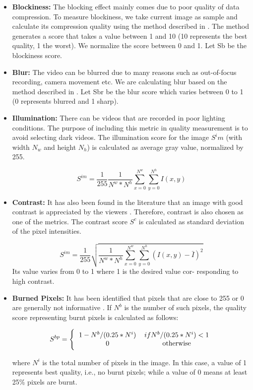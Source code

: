 \documentclass{sig-alternate}
\begin{document}
\begin{itemize}
\item \textbf{Blockiness:} The blocking effect mainly comes due to poor quality of data compression. To measure blockiness, we take current image as sample and calculate its compression quality using the method described in \cite{18}. The method generates
a score that takes a value between 1 and 10 (10 represents the
best quality, 1 the worst). We normalize the score between 0
and 1. Let Sb be the blockiness score.
\item \textbf{Blur:} The video can be blurred due to many reasons such as out-of-focus recording, camera movement etc. We are calculating blur based on the method described in \cite{5}. Let Sbr be the blur score which varies between 0 to 1 (0 represents
blurred and 1 sharp).

\item \textbf{Illumination:} There can be videos that are recorded in poor lighting conditions. The purpose of including this metric in quality measurement is to avoid selecting dark videos. The illumination score for the image $S^im$ (with width $N_w$ and height $N_h$) is calculated as average gray value, normalized by 255.

\begin{equation}
    S^{im} = \frac{1}{255}\frac{1}{N^w*N^h}\sum_{x=0}^{N^w}\sum_{y=0}^{N^h}I(x,y)
\end{equation}

\item \textbf{Contrast:} It has also been found in the literature that an image with good contrast is appreciated by the viewers \cite{10}. Therefore, contrast is also chosen as one of the metrics. The contrast score $S^c$ is calculated as standard deviation of the pixel intensities.

\begin{equation}
    S^{im} = \frac{1}{255}\sqrt{\frac{1}{N^w*N^h}\sum_{x=0}^{N^w}\sum_{y=0}^{N^h}(I(x,y) - \bar{I})^2}
\end{equation}
Its value varies from 0 to 1 where 1 is the desired value cor-
responding to high contrast.

\item \textbf{Burned Pixels:} It has been identified that pixels that are
close to 255 or 0 are generally not informative \cite{15}. If $N^b$
is the number of such pixels, the quality score representing
burnt pixels is calculated as follows:

\begin{equation} S^{bp} = \Bigg\{ 
\begin{tabular}{cc}
 $1-N^b/(0.25*N^i)  $&$  if N^b/(0.25*N^i) < 1$\\
 0 &  otherwise
\end{tabular}  
\end{equation}

where $N^i$ is the total number of pixels in the image. In this
case, a value of 1 represents best quality, i.e., no burnt pixels;
while a value of 0 means at least 25\% pixels are burnt.

\end{itemize}
\end{document}
